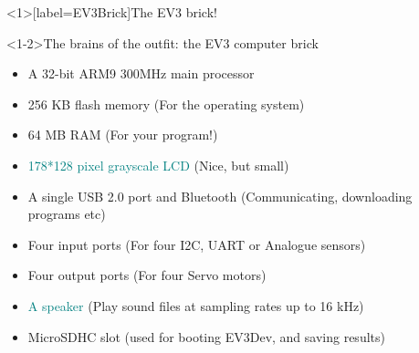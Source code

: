 \documentclass[color=pdftex,usenames,dvipsnames, aspectratio=169]{beamer}
\begin{document}
\begin{frame}<1>[label=EV3Brick]{The EV3 brick!}

\begin{block}<1-2>{The brains of the outfit: the EV3 computer brick}
\begin{itemize}
    \item A \textcolor{OliveGreen}{32-bit ARM9 300MHz main processor}
    \item 256 KB flash memory (For the operating system)
    \item \alert{64 MB RAM (For your program!)}
    \item \textcolor{teal}{178*128 pixel grayscale LCD} (Nice, but small)
    \item \textcolor{OliveGreen}{A single USB 2.0 port and Bluetooth} (Communicating, downloading programs etc)
    \item \alert{Four input ports} (For four I2C, UART or Analogue sensors)
    \item \alert{Four output ports} (For four Servo motors)
    \item \textcolor{teal}{A speaker} (Play sound files at sampling rates up to 16 kHz)
    \item MicroSDHC slot (used for booting EV3Dev, and saving results)
\end{itemize}
\end{block}
\end{frame}
\end{document}

